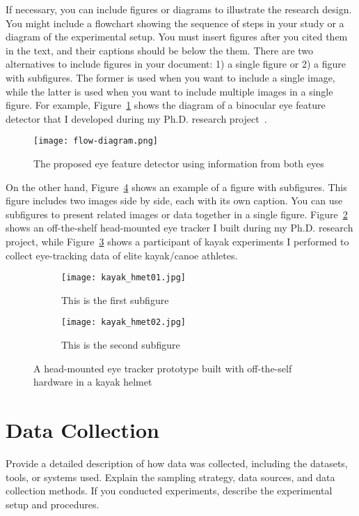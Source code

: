 If necessary, you can include figures or diagrams to illustrate the research design. You might include a flowchart showing the sequence of steps in your study or a diagram of the experimental setup. You must insert figures after you cited them in the text, and their captions should be below the them. There are two alternatives to include figures in your document: 1) a single figure or 2) a figure with subfigures. The former is used when you want to include a single image, while the latter is used when you want to include multiple images in a single figure. For example, Figure~\ref{fig:flow-diagram} shows the diagram of a binocular eye feature detector that I developed during my Ph.D. research project~\cite{Narcizo2017}.
\begin{figure}[htbp]
    \centering
    \texttt{[image: flow-diagram.png]}
    \caption{The proposed eye feature detector using information from both eyes}
    \label{fig:flow-diagram}
\end{figure}

On the other hand, Figure~\ref{fig:sub-figures} shows an example of a figure with subfigures. This figure includes two images side by side, each with its own caption. You can use subfigures to present related images or data together in a single figure. Figure~\ref{fig:sub-figure-a} shows an off-the-shelf head-mounted eye tracker I built during my Ph.D. research project, while Figure~\ref{fig:sub-figure-b} shows a participant of kayak experiments I performed to collect eye-tracking data of elite kayak/canoe athletes.
\begin{figure}[!ht]
    \centering
    \begin{subfigure}[b]{0.49\textwidth}
        \caption{This is the first subfigure}
        \label{fig:sub-figure-a}
        \texttt{[image: kayak\_hmet01.jpg]}
    \end{subfigure}
    \begin{subfigure}[b]{0.49\textwidth}
        \caption{This is the second subfigure}
        \label{fig:sub-figure-b}
        \texttt{[image: kayak\_hmet02.jpg]}
    \end{subfigure}
    \caption{A head-mounted eye tracker prototype built with oﬀ-the-self hardware in a kayak helmet}
    \label{fig:sub-figures}
\end{figure}

\section{Data Collection}\label{sec:data-collection}
Provide a detailed description of how data was collected, including the datasets, tools, or systems used. Explain the sampling strategy, data sources, and data collection methods. If you conducted experiments, describe the experimental setup and procedures.

